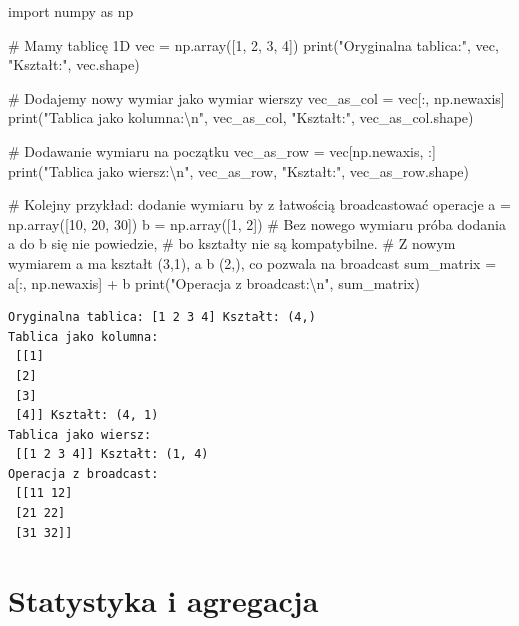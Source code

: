\documentclass[
  letterpaper,
  DIV=11,
  numbers=noendperiod]{scrreprt}
\newenvironment{Shaded}{\begin{snugshade}}{\end{snugshade}}
\newcommand{\BuiltInTok}[1]{\textcolor[rgb]{0.00,0.23,0.31}{#1}}
\newcommand{\CharTok}[1]{\textcolor[rgb]{0.13,0.47,0.30}{#1}}
\newcommand{\CommentTok}[1]{\textcolor[rgb]{0.37,0.37,0.37}{#1}}
\newcommand{\DecValTok}[1]{\textcolor[rgb]{0.68,0.00,0.00}{#1}}
\newcommand{\ImportTok}[1]{\textcolor[rgb]{0.00,0.46,0.62}{#1}}
\newcommand{\NormalTok}[1]{\textcolor[rgb]{0.00,0.23,0.31}{#1}}
\newcommand{\OperatorTok}[1]{\textcolor[rgb]{0.37,0.37,0.37}{#1}}
\newcommand{\StringTok}[1]{\textcolor[rgb]{0.13,0.47,0.30}{#1}}
\begin{document}
\begin{Shaded}
\begin{Highlighting}[]
\ImportTok{import}\NormalTok{ numpy }\ImportTok{as}\NormalTok{ np}

\CommentTok{\# Mamy tablicę 1D}
\NormalTok{vec }\OperatorTok{=}\NormalTok{ np.array([}\DecValTok{1}\NormalTok{, }\DecValTok{2}\NormalTok{, }\DecValTok{3}\NormalTok{, }\DecValTok{4}\NormalTok{])}
\BuiltInTok{print}\NormalTok{(}\StringTok{"Oryginalna tablica:"}\NormalTok{, vec, }\StringTok{"Kształt:"}\NormalTok{, vec.shape)}

\CommentTok{\# Dodajemy nowy wymiar jako wymiar wierszy}
\NormalTok{vec\_as\_col }\OperatorTok{=}\NormalTok{ vec[:, np.newaxis]}
\BuiltInTok{print}\NormalTok{(}\StringTok{"Tablica jako kolumna:}\CharTok{\textbackslash{}n}\StringTok{"}\NormalTok{, vec\_as\_col, }\StringTok{"Kształt:"}\NormalTok{, vec\_as\_col.shape)}

\CommentTok{\# Dodawanie wymiaru na początku}
\NormalTok{vec\_as\_row }\OperatorTok{=}\NormalTok{ vec[np.newaxis, :]}
\BuiltInTok{print}\NormalTok{(}\StringTok{"Tablica jako wiersz:}\CharTok{\textbackslash{}n}\StringTok{"}\NormalTok{, vec\_as\_row, }\StringTok{"Kształt:"}\NormalTok{, vec\_as\_row.shape)}

\CommentTok{\# Kolejny przykład: dodanie wymiaru by z łatwością broadcastować operacje}
\NormalTok{a }\OperatorTok{=}\NormalTok{ np.array([}\DecValTok{10}\NormalTok{, }\DecValTok{20}\NormalTok{, }\DecValTok{30}\NormalTok{])}
\NormalTok{b }\OperatorTok{=}\NormalTok{ np.array([}\DecValTok{1}\NormalTok{, }\DecValTok{2}\NormalTok{])}
\CommentTok{\# Bez nowego wymiaru próba dodania a do b się nie powiedzie, }
\CommentTok{\# bo kształty nie są kompatybilne.}
\CommentTok{\# Z nowym wymiarem a ma kształt (3,1), a b (2,), co pozwala na broadcast}
\NormalTok{sum\_matrix }\OperatorTok{=}\NormalTok{ a[:, np.newaxis] }\OperatorTok{+}\NormalTok{ b}
\BuiltInTok{print}\NormalTok{(}\StringTok{"Operacja z broadcast:}\CharTok{\textbackslash{}n}\StringTok{"}\NormalTok{, sum\_matrix)}
\end{Highlighting}
\end{Shaded}

\begin{verbatim}
Oryginalna tablica: [1 2 3 4] Kształt: (4,)
Tablica jako kolumna:
 [[1]
 [2]
 [3]
 [4]] Kształt: (4, 1)
Tablica jako wiersz:
 [[1 2 3 4]] Kształt: (1, 4)
Operacja z broadcast:
 [[11 12]
 [21 22]
 [31 32]]
\end{verbatim}

\section{Statystyka i agregacja}\label{statystyka-i-agregacja}
\end{document}
